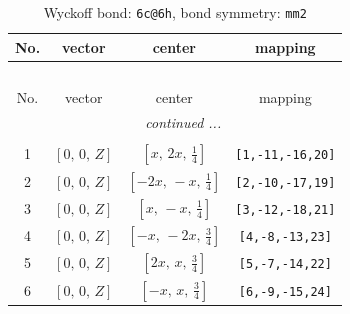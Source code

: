 \documentclass[fleqn,8pt]{jsarticle}
\begin{document}
\begin{longtable}{cccc}
\caption{Wyckoff bond: {\tt 6c@6h}, bond symmetry: {\tt mm2}}
 \\
 \hline \hline
No. & vector & center & mapping \\ \hline \endfirsthead

\multicolumn{3}{l}{\tablename\ \thetable{}} \\
 \hline \hline
No. & vector & center & mapping \\ \hline \endhead

 \hline \hline
\multicolumn{3}{r}{\footnotesize\it continued ...} \\ \endfoot

 \hline \hline
\multicolumn{3}{r}{} \\ \endlastfoot

1 & $\left[ 0,\, 0,\, Z \right]$ & $\left[ x,\, 2 x,\, \frac{1}{4} \right]$ & {\tt [1,-11,-16,20]} \\ \hline
2 & $\left[ 0,\, 0,\, Z \right]$ & $\left[ - 2 x,\, - x,\, \frac{1}{4} \right]$ & {\tt [2,-10,-17,19]} \\ \hline
3 & $\left[ 0,\, 0,\, Z \right]$ & $\left[ x,\, - x,\, \frac{1}{4} \right]$ & {\tt [3,-12,-18,21]} \\ \hline
4 & $\left[ 0,\, 0,\, Z \right]$ & $\left[ - x,\, - 2 x,\, \frac{3}{4} \right]$ & {\tt [4,-8,-13,23]} \\ \hline
5 & $\left[ 0,\, 0,\, Z \right]$ & $\left[ 2 x,\, x,\, \frac{3}{4} \right]$ & {\tt [5,-7,-14,22]} \\ \hline
6 & $\left[ 0,\, 0,\, Z \right]$ & $\left[ - x,\, x,\, \frac{3}{4} \right]$ & {\tt [6,-9,-15,24]} \\
\end{longtable}
\renewcommand{\arraystretch}{1.2}
\end{document}
